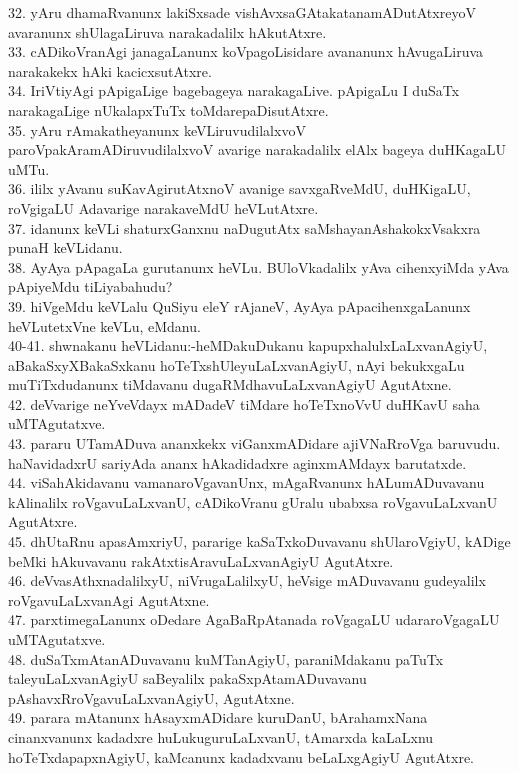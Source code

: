 \documentclass{article}
\begin{document}
32. yAru dhamaRvanunx lakiSxsade vishAvxsaGAtakatanamADutAtxreyoV avaranunx shUlagaLiruva narakadalilx hAkutAtxre.\\
33. cADikoVranAgi janagaLanunx koVpagoLisidare avananunx hAvugaLiruva narakakekx hAki kacicxsutAtxre.\\
34. IriVtiyAgi pApigaLige bagebageya narakagaLive. pApigaLu I duSaTx narakagaLige nUkalapxTuTx toMdarepaDisutAtxre.\\
35. yAru rAmakatheyanunx keVLiruvudilalxvoV paroVpakAramADiruvudilalxvoV avarige narakadalilx elAlx bageya duHKagaLU uMTu.\\
36. ililx yAvanu suKavAgirutAtxnoV avanige savxgaRveMdU, duHKigaLU, roVgigaLU Adavarige narakaveMdU heVLutAtxre.\\
37. idanunx keVLi shaturxGanxnu naDugutAtx saMshayanAshakokxVsakxra punaH keVLidanu.\\
38. AyAya pApagaLa gurutanunx heVLu. BUloVkadalilx yAva cihenxyiMda yAva pApiyeMdu tiLiyabahudu?\\
39. hiVgeMdu keVLalu QuSiyu eleY rAjaneV, AyAya pApacihenxgaLanunx heVLutetxVne keVLu, eMdanu.\\
40-41. shwnakanu heVLidanu:-heMDakuDukanu kapupxhalulxLaLxvanAgiyU, aBakaSxyXBakaSxkanu hoTeTxshUleyuLaLxvanAgiyU, nAyi bekukxgaLu muTiTxdudanunx tiMdavanu dugaRMdhavuLaLxvanAgiyU AgutAtxne.\\
42. deVvarige neYveVdayx mADadeV tiMdare hoTeTxnoVvU duHKavU saha uMTAgutatxve.\\
43. pararu UTamADuva ananxkekx viGanxmADidare ajiVNaRroVga baruvudu. haNavidadxrU sariyAda ananx hAkadidadxre aginxmAMdayx barutatxde.\\
44. viSahAkidavanu vamanaroVgavanUnx, mAgaRvanunx hALumADuvavanu kAlinalilx roVgavuLaLxvanU, cADikoVranu gUralu ubabxsa roVgavuLaLxvanU AgutAtxre.\\
45. dhUtaRnu apasAmxriyU, pararige kaSaTxkoDuvavanu shUlaroVgiyU, kADige beMki hAkuvavanu rakAtxtisAravuLaLxvanAgiyU AgutAtxre.\\
46. deVvasAthxnadalilxyU, niVrugaLalilxyU, heVsige mADuvavanu gudeyalilx roVgavuLaLxvanAgi AgutAtxne.\\
47. parxtimegaLanunx oDedare AgaBaRpAtanada roVgagaLU udararoVgagaLU uMTAgutatxve.\\
48. duSaTxmAtanADuvavanu kuMTanAgiyU, paraniMdakanu paTuTx taleyuLaLxvanAgiyU saBeyalilx pakaSxpAtamADuvavanu pAshavxRroVgavuLaLxvanAgiyU, AgutAtxne.\\
49. parara mAtanunx hAsayxmADidare kuruDanU, bArahamxNana cinanxvanunx kadadxre huLukuguruLaLxvanU, tAmarxda kaLaLxnu hoTeTxdapapxnAgiyU, kaMcanunx kadadxvanu beLaLxgAgiyU AgutAtxre.\\
\end{document}
